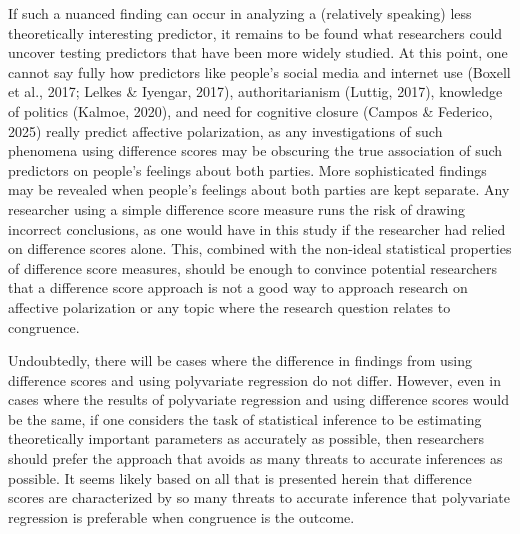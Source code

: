 \documentclass[authordate, meta, issue]{jote-new-article}
\begin{document}
	If such a nuanced finding can occur in analyzing a (relatively speaking) less theoretically interesting predictor, it remains to be found what researchers could uncover testing predictors that have been more widely studied. At this point, one cannot say fully how predictors like people's social media and internet use (Boxell et al., 2017; Lelkes \& Iyengar, 2017), authoritarianism (Luttig, 2017), knowledge of politics (Kalmoe, 2020), and need for cognitive closure (Campos \& Federico, 2025) really predict affective polarization, as any investigations of such phenomena using difference scores may be obscuring the true association of such predictors on people's feelings about both parties. More sophisticated findings may be revealed when people's feelings about both parties are kept separate. Any researcher using a simple difference score measure runs the risk of drawing incorrect conclusions, as one would have in this study if the researcher had relied on difference scores alone. This, combined with the non-ideal statistical properties of difference score measures, should be enough to convince potential researchers that a difference score approach is not a good way to approach research on affective polarization or any topic where the research question relates to congruence.



	Undoubtedly, there will be cases where the difference in findings from using difference scores and using polyvariate regression do not differ. However, even in cases where the results of polyvariate regression and using difference scores would be the same, if one considers the task of statistical inference to be estimating theoretically important parameters as accurately as possible, then researchers should prefer the approach that avoids as many threats to accurate inferences as possible. It seems likely based on all that is presented herein that difference scores are characterized by so many threats to accurate inference that polyvariate regression is preferable when congruence is the outcome.
\end{document}
